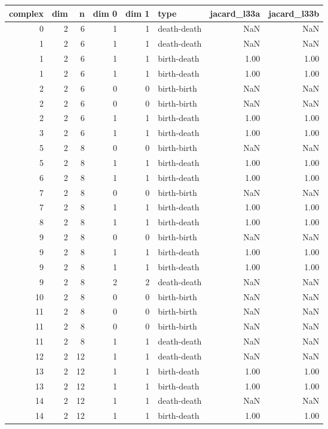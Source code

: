 \documentclass{article}
\begin{document}
\begin{center}
\begin{tabular}{rrrrrlrr}
\toprule
complex & dim & n & dim 0 & dim 1 & type & jacard\_l33a & jacard\_l33b \\
\midrule
0 & 2 & 6 & 1 & 1 & death-death & NaN & NaN \\
1 & 2 & 6 & 1 & 1 & death-death & NaN & NaN \\
1 & 2 & 6 & 1 & 1 & birth-death & 1.00 & 1.00 \\
1 & 2 & 6 & 1 & 1 & birth-death & 1.00 & 1.00 \\
2 & 2 & 6 & 0 & 0 & birth-birth & NaN & NaN \\
2 & 2 & 6 & 0 & 0 & birth-birth & NaN & NaN \\
2 & 2 & 6 & 1 & 1 & birth-death & 1.00 & 1.00 \\
3 & 2 & 6 & 1 & 1 & birth-death & 1.00 & 1.00 \\
5 & 2 & 8 & 0 & 0 & birth-birth & NaN & NaN \\
5 & 2 & 8 & 1 & 1 & birth-death & 1.00 & 1.00 \\
6 & 2 & 8 & 1 & 1 & birth-death & 1.00 & 1.00 \\
7 & 2 & 8 & 0 & 0 & birth-birth & NaN & NaN \\
7 & 2 & 8 & 1 & 1 & birth-death & 1.00 & 1.00 \\
8 & 2 & 8 & 1 & 1 & birth-death & 1.00 & 1.00 \\
9 & 2 & 8 & 0 & 0 & birth-birth & NaN & NaN \\
9 & 2 & 8 & 1 & 1 & birth-death & 1.00 & 1.00 \\
9 & 2 & 8 & 1 & 1 & birth-death & 1.00 & 1.00 \\
9 & 2 & 8 & 2 & 2 & death-death & NaN & NaN \\
10 & 2 & 8 & 0 & 0 & birth-birth & NaN & NaN \\
11 & 2 & 8 & 0 & 0 & birth-birth & NaN & NaN \\
11 & 2 & 8 & 0 & 0 & birth-birth & NaN & NaN \\
11 & 2 & 8 & 1 & 1 & death-death & NaN & NaN \\
12 & 2 & 12 & 1 & 1 & death-death & NaN & NaN \\
13 & 2 & 12 & 1 & 1 & birth-death & 1.00 & 1.00 \\
13 & 2 & 12 & 1 & 1 & birth-death & 1.00 & 1.00 \\
14 & 2 & 12 & 1 & 1 & death-death & NaN & NaN \\
14 & 2 & 12 & 1 & 1 & birth-death & 1.00 & 1.00 \\

\end{tabular}
\end{center}
\end{document}
